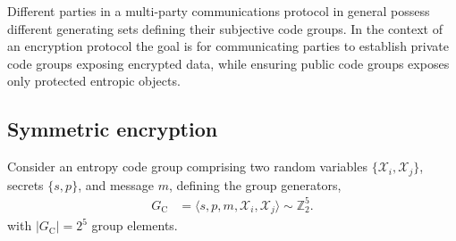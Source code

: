 \documentclass[twocolumn, aps, amsmath, amssymb, nofootinbib, superscriptaddress, longbibliography, doublefloatfix, table-of-contents, eqsecnum, rmp]{revtex4-2}
\makeatletter
\newcommand{\soplus}{{{\hspace{1pt}}{\mathbin{\mathpalette\make@small{\mathbin\oplus}}}}{\hspace{1pt}}}
\newcommand{\make@small}[2]{%
  \vcenter{\hbox{%
    \scalebox{0.6}{$\m@th#1#2$}%
  }}%
}
\makeatother
\begin{document}
Different parties in a multi-party communications protocol in general possess different generating sets defining their subjective code groups. In the context of an encryption protocol the goal is for communicating parties to establish private code groups exposing encrypted data, while ensuring public code groups exposes only protected entropic objects.

\subsection{Symmetric encryption}

Consider an entropy code group comprising two random variables $\{\mathcal{X}_i,\mathcal{X}_j\}$, secrets $\{s,p\}$, and message $m$, defining the group generators,
\begin{align}
	G_\mathrm{C} &= \langle s,p,m,\mathcal{X}_i,\mathcal{X}_j \rangle \sim \mathbb{Z}_2^5.
\end{align}
with $|G_\mathrm{C}|=2^5$ group elements.
\end{document}
